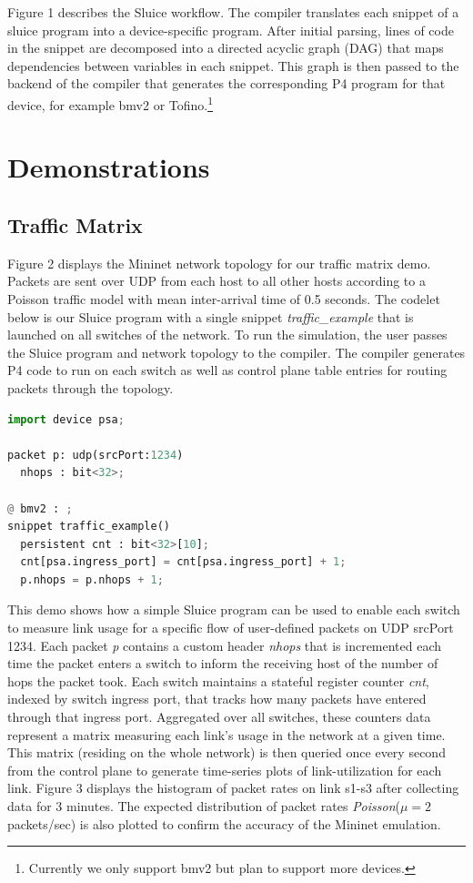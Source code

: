 Figure 1 describes the Sluice workflow. The compiler translates each snippet of
a sluice program into a device-specific program. After initial parsing, lines
of code in the snippet are decomposed into a directed acyclic graph (DAG) that
maps dependencies between variables in each snippet. This graph is then passed
to the backend of the compiler that generates the corresponding P4 program for
that device, for example bmv2 or Tofino.\footnote{Currently we only support
bmv2 but plan to support more devices.} 


\section{Demonstrations}
 
\subsection{Traffic Matrix}

Figure 2 displays the Mininet network topology for our traffic matrix demo.
Packets are sent over UDP from each host to all other hosts according to a
Poisson traffic model with mean inter-arrival time of 0.5 seconds. The codelet
below is our Sluice program with a single snippet \textit{traffic\_example}
that is launched on all switches of the network. To run the simulation, the
user passes the Sluice program and network topology to the compiler. The
compiler generates P4 code to run on each switch as well as control plane table
entries for routing packets through the topology.

\begin{lstlisting}[language=Python, basicstyle=\scriptsize]
import device psa;

packet p: udp(srcPort:1234)
  nhops : bit<32>;

@ bmv2 : ;
snippet traffic_example()
  persistent cnt : bit<32>[10];
  cnt[psa.ingress_port] = cnt[psa.ingress_port] + 1;
  p.nhops = p.nhops + 1;
\end{lstlisting}

This demo shows how a simple Sluice program can be used to enable each switch
to measure link usage for a specific flow of user-defined packets on UDP
srcPort 1234. Each packet \textit{p} contains a custom header \textit{nhops}
that is incremented each time the packet enters a switch to inform the
receiving host of the number of hops the packet took. Each switch maintains a
stateful register counter \textit{cnt}, indexed by switch ingress port, that
tracks how many packets have entered through that ingress port. Aggregated over
all switches, these counters data represent a matrix measuring each link's
usage in the network at a given time. This matrix (residing on the whole
network) is then queried once every second from the control plane to generate
time-series plots of link-utilization for each link. Figure 3 displays the
histogram of packet rates on link s1-s3 after collecting data for 3 minutes.
The expected distribution of packet rates \textit{Poisson}($\mu = 2$
packets/sec) is also plotted to confirm the accuracy of the Mininet emulation.

